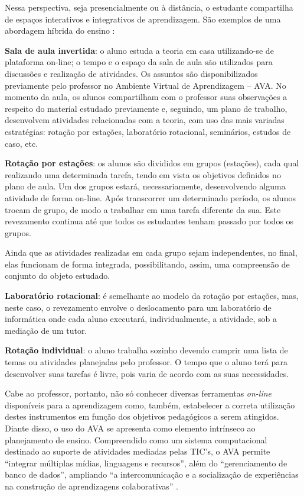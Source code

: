 \documentclass[
	12pt,				%
	openright,			%
  oneside,     %
	a4paper,			%
	chapter=TITLE,		%
	english,			%
	french,				%
	spanish,			%
	brazil				%
	]{abntex2}
\begin{document}
Nessa perspectiva, seja presencialmente ou à distância, o estudante compartilha de espaços interativos e integrativos de aprendizagem. São exemplos de uma abordagem híbrida do ensino \cite{bacich2015ensino}:

\noindent \textbf{Sala de aula invertida}: o aluno estuda a teoria em casa utilizando-se de plataforma on-line; o tempo e o espaço da sala de aula são utilizados para discussões e realização de atividades. Os assuntos são disponibilizados previamente pelo professor no Ambiente Virtual de Aprendizagem – AVA. No momento da aula, os alunos compartilham com o professor suas observações a respeito do material estudado previamente e, seguindo, um plano de trabalho, desenvolvem atividades relacionadas com a teoria, com uso das mais variadas estratégias: rotação por estações, laboratório rotacional, seminários, estudos de caso, etc.

\noindent \textbf{Rotação por estações}: os alunos são divididos em grupos (estações), cada qual realizando uma determinada tarefa, tendo em vista os objetivos definidos no plano de aula. Um dos grupos estará, necessariamente, desenvolvendo alguma atividade de forma on-line. Após transcorrer um determinado período, os alunos trocam de grupo, de modo a trabalhar em uma tarefa diferente da sua. Este revezamento continua até que todos os estudantes tenham passado por todos os grupos. 

Ainda que as atividades realizadas em cada grupo sejam independentes, no final, elas funcionam de forma integrada, possibilitando, assim, uma compreensão de conjunto do objeto estudado.

\noindent \textbf{Laboratório rotacional}: é semelhante ao modelo da rotação por estações, mas, neste caso, o revezamento envolve o deslocamento para um laboratório de informática onde cada aluno executará, individualmente, a atividade, sob a mediação de um tutor.

\noindent \textbf{Rotação individual}: o aluno trabalha sozinho devendo cumprir uma lista de temas ou atividades planejadas pelo professor. O tempo que o aluno terá para desenvolver suas tarefas é livre, pois varia de acordo com as suas necessidades.

Cabe ao professor, portanto, não só conhecer diversas ferramentas \textit{on-line} disponíveis para a aprendizagem como, também, estabelecer a correta utilização destes instrumentos em função dos objetivos pedagógicos a serem atingidos. Diante disso, o uso do AVA se apresenta como elemento intrínseco ao planejamento de ensino. Compreendido como um sistema computacional destinado ao suporte de atividades mediadas pelas TIC's, o AVA permite ``integrar múltiplas mídias, linguagens e recursos'', além do ``gerenciamento de banco de dados'', ampliando ``a intercomunicação e a socialização de experiências na construção de aprendizagens colaborativas'' \cite[p.~2]{silva2013interfaces} \cite{fidem2017agencia}.
	
\end{document}
